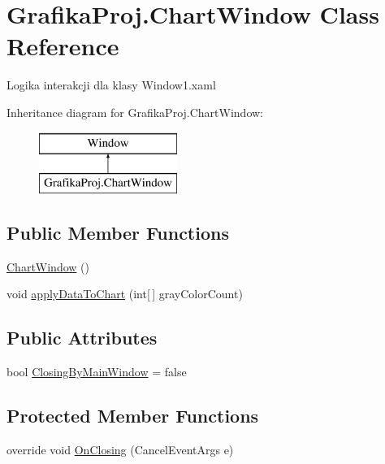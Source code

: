 \hypertarget{class_grafika_proj_1_1_chart_window}{}\section{Grafika\+Proj.\+Chart\+Window Class Reference}
\label{class_grafika_proj_1_1_chart_window}


Logika interakcji dla klasy Window1.\+xaml  


Inheritance diagram for Grafika\+Proj.\+Chart\+Window\+:\begin{figure}[H]
\begin{center}
\leavevmode
\includegraphics[height=2.000000cm]{class_grafika_proj_1_1_chart_window}
\end{center}
\end{figure}
\subsection*{Public Member Functions}
\begin{DoxyCompactItemize}
\item 
\mbox{\hyperlink{class_grafika_proj_1_1_chart_window_ac696df976fa315b77d06a27d54319ff0}{Chart\+Window}} ()
\item 
void \mbox{\hyperlink{class_grafika_proj_1_1_chart_window_a2242be11c88280fc58cefc8dcf84bc7b}{apply\+Data\+To\+Chart}} (int\mbox{[}$\,$\mbox{]} gray\+Color\+Count)
\end{DoxyCompactItemize}
\subsection*{Public Attributes}
\begin{DoxyCompactItemize}
\item 
bool \mbox{\hyperlink{class_grafika_proj_1_1_chart_window_a5f0b6593f705758e86402373f75fb0bf}{Closing\+By\+Main\+Window}} = false
\end{DoxyCompactItemize}
\subsection*{Protected Member Functions}
\begin{DoxyCompactItemize}
\item 
override void \mbox{\hyperlink{class_grafika_proj_1_1_chart_window_a300bce704ffe7ac5d1e03e9ce8d3de75}{On\+Closing}} (Cancel\+Event\+Args e)
\end{DoxyCompactItemize}


